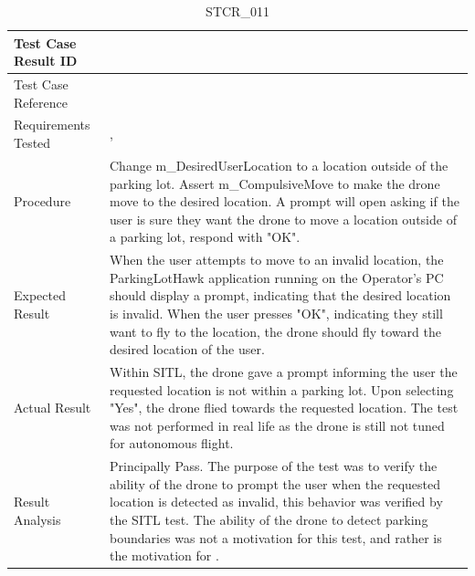 \documentclass[12pt, titlepage]{article}
\begin{document}
\begin{table}[!h]
\begin{center}
\caption {STCR\_011}
\label{tab:STCR_011}
\begin{tabular}{ | m{3.2cm} | m{12.2cm} | } 
\hline
Test Case Result ID & \nameref{tab:STCR_011} \\ 
\hline
Test Case Reference & \nameref{tab:STC_011}  \\ 
\hline
Requirements Tested & \nameref{STA_013}, \nameref{TRANS_005} \\ 
\hline
Procedure & Change m\_DesiredUserLocation to a location outside of the parking lot. Assert m\_CompulsiveMove to make the drone move to the desired location. A prompt will open asking if the user is sure they want the drone to move a location outside of a parking lot, respond with "OK". \\
\hline
Expected Result & When the user attempts to move to an invalid location, the ParkingLotHawk application running on the Operator's PC should display a prompt, indicating that the desired location is invalid. When the user presses "OK", indicating they still want to fly to the location, the drone should fly toward the desired location of the user.  \\ 
\hline
Actual Result & Within SITL, the drone gave a prompt informing the user the requested location is not within a parking lot. Upon selecting "Yes", the drone flied towards the requested location. The test was not performed in real life as the drone is still not tuned for autonomous flight.  \\
\hline
Result Analysis & Principally Pass. The purpose of the test was to verify the ability of the drone to prompt the user when the requested location is detected as invalid, this behavior was verified by the SITL test. The ability of the drone to detect parking boundaries was not a motivation for this test, and rather is the motivation for \nameref{tab:STC_014}.  \\ 
\hline
\end{tabular}
\end{center}
\end{table}
\end{document}
